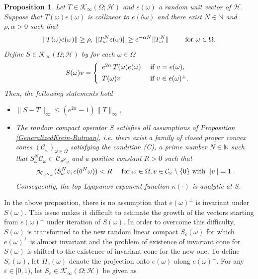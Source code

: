 \documentclass[pdflatex,sn-mathphys-num]{sn-jnl}%
\theoremstyle{thmstyleone}%
\newtheorem{proposition}[theorem]{Proposition}%
\theoremstyle{thmstyletwo}%
\theoremstyle{thmstylethree}%
\newcommand{\N}{\mathbb{N}}
\newcommand{\cH}{\mathcal{H}}
\newcommand{\eps}{\varepsilon}
\numberwithin{equation}{section}
\begin{document}
\begin{proposition}\label{TechnicalProposition_C}
 Let $T\in \mathcal K_{\infty}(\Omega;\mathcal H)$ and $e(\omega)$ a random unit vector of $\cH$. Suppose that $T(\omega)e(\omega)$ is collinear to $e(\theta\omega)$ and there exist  $N\in \N$ and $\rho,\alpha>0$ such that  \begin{equation}\label{dominateddirection}
\|T(\omega)e(\omega)\|\geq \rho,\; \|T_{\omega}^N e(\omega)\|\geq e^{-\alpha N}\|T_{\omega}^N\|\qquad\hbox{ for  }  \omega\in\Omega.   
\end{equation}
Define $S\in \mathcal K_{\infty}(\Omega;\mathcal H)$ by for each $\omega\in\Omega$ 
\begin{equation}\label{Perturbed_Operator}
S(\omega) v
=
\left\{
\begin{array}{ll}
   e^{2\alpha }\, T(\omega)e(\omega)  & \hbox{ if } v=e(\omega),  \\[1ex]
   T(\omega)v     &  \hbox{ if } v\in e(\omega)^{\perp}.
\end{array}
\right.
\end{equation}
Then, the following statements hold
\begin{itemize}
    \item [(i)] $\|S-T\|_{\infty}
    \leq (e^{2\alpha }-1)\|T\|_{\infty}$,
    \item [(ii)] The random compact operator $S$ satisfies all assumptions of Proposition \ref{GeneralizedKrein-Rutman}, i.e. there exist  a family of closed proper convex cones $(\mathcal C_{\omega})_{\omega\in \Omega}$ satisfying the condition (C),  a prime number $N\in\mathbb N$  such that $S^N_{\omega}\mathcal C_{\omega}\subset \mathcal C_{\theta^N \omega}$ and  a positive constant $R>0$ such that 
\[
\beta_{\mathcal C_{\theta^N\omega}}(S^N_{\omega}v, c(\theta^N\omega))< R\quad \hbox{ for } \omega\in\Omega, v\in \mathcal C_{\omega}\setminus\{0\} \hbox{ with } \|v\|=1.
\]
Consequently, the top Lyapunov exponent function $\kappa(\cdot)$ is analytic at $S$.
\end{itemize}
\end{proposition}
%
In the above proposition, there is no assumption that $e(\omega)^{\perp}$ is invariant under $S(\omega)$. This issue makes it difficult to estimate the growth of the vectors starting from $e(\omega)^{\perp}$ under iteration of $S(\omega)$. In order to overcome this difficulty, $S(\omega)$ is transformed to the new random linear compact $S_{\eps}(\omega)$ for which $e(\omega)^{\perp}$ is almost invariant and the problem of existence of invariant cone for $S(\omega)$ is shifted to the existence of invariant cone for the new one. To define $S_{\eps}(\omega)$, let $\Pi_e(\omega)$ denote the projection onto $e(\omega)$ along $e(\omega)^{\perp}$. For any $\eps\in [0,1)$, let $S_{\eps}\in \mathcal K_{\infty}(\Omega;\mathcal H)$ be given as  
\end{document}
